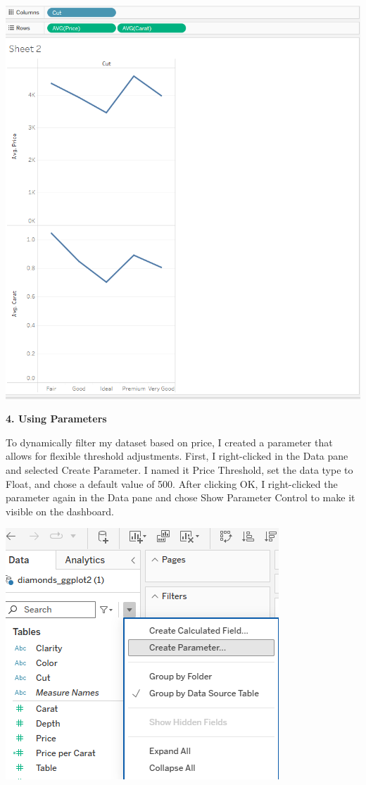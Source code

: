 \documentclass[
  letterpaper,
  DIV=11,
  numbers=noendperiod]{scrreprt}
\begin{document}
\includegraphics{Step2_Dual_Axis_Chart_Price_Per_Carat _Olufawo.png}

\textbf{4. Using Parameters}

To dynamically filter my dataset based on price, I created a parameter
that allows for flexible threshold adjustments. First, I right-clicked
in the Data pane and selected Create Parameter. I named it Price
Threshold, set the data type to Float, and chose a default value of 500.
After clicking OK, I right-clicked the parameter again in the Data pane
and chose Show Parameter Control to make it visible on the dashboard.

\includegraphics{Step1_Creating_Parameters_Olufawo.png}
\end{document}
